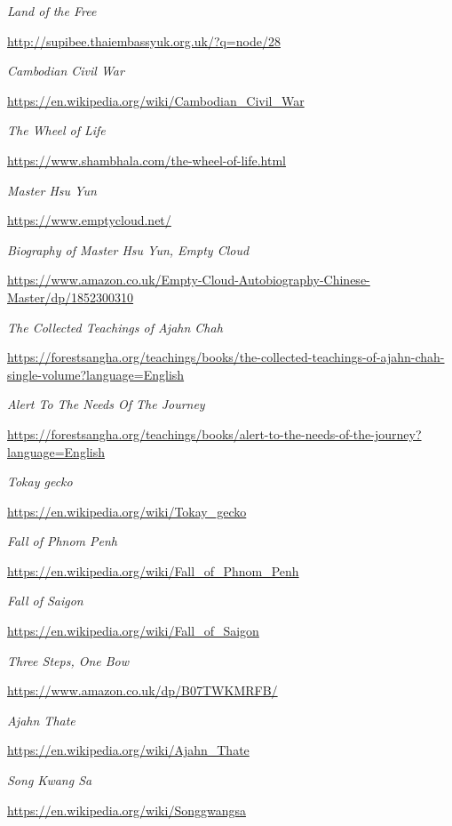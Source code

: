 \begin{thebibliography}{9}
 \emph{Land of the Free}

  {\urlsize \url{http://supibee.thaiembassyuk.org.uk/?q=node/28}}

 \emph{Cambodian Civil War}

  {\urlsize \url{https://en.wikipedia.org/wiki/Cambodian_Civil_War}}

 \emph{The Wheel of Life}

  {\urlsize \url{https://www.shambhala.com/the-wheel-of-life.html}}

 \emph{Master Hsu Yun}

  {\urlsize \url{https://www.emptycloud.net/}}

 \emph{Biography of Master Hsu Yun, Empty Cloud}

  {\urlsize \url{https://www.amazon.co.uk/Empty-Cloud-Autobiography-Chinese-Master/dp/1852300310}}

 \emph{The Collected Teachings of Ajahn Chah}

  {\urlsize \url{https://forestsangha.org/teachings/books/the-collected-teachings-of-ajahn-chah-single-volume?language=English}}

 \emph{Alert To The Needs Of The Journey}

  {\urlsize \url{https://forestsangha.org/teachings/books/alert-to-the-needs-of-the-journey?language=English}}

 \emph{Tokay gecko}

  {\urlsize \url{https://en.wikipedia.org/wiki/Tokay_gecko}}

 \emph{Fall of Phnom Penh}

  {\urlsize \url{https://en.wikipedia.org/wiki/Fall_of_Phnom_Penh}}

 \emph{Fall of Saigon}

  {\urlsize \url{https://en.wikipedia.org/wiki/Fall_of_Saigon}}

 \emph{Three Steps, One Bow}

  {\urlsize \url{https://www.amazon.co.uk/dp/B07TWKMRFB/}}

 \emph{Ajahn Thate}

  {\urlsize \url{https://en.wikipedia.org/wiki/Ajahn_Thate}}

 \emph{Song Kwang Sa}

  {\urlsize \url{https://en.wikipedia.org/wiki/Songgwangsa}}


\end{thebibliography}
